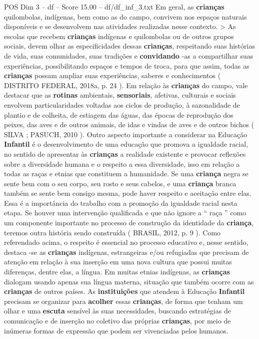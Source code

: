 \begin{textsample}{POS Dim 3 – df – Score 15.00 – df/df\_inf\_3.txt}
Em geral, as \textbf{crianças} quilombolas, indígenas, bem como as do campo, convivem nos espaços naturais disponíveis e se desenvolvem nas atividades realizadas nesse contexto. > As escolas que recebem \textbf{crianças} indígenas e quilombolas ou de outros grupos sociais, devem olhar as especificidades dessas \textbf{crianças}, respeitando suas histórias de vida, suas comunidades, suas tradições e \textbf{convidando} -as a compartilhar suas experiências, possibilitando espaços e tempos de troca, para que assim, todas as \textbf{crianças} possam ampliar suas experiências, saberes e conhecimentos ( DISTRITO FEDERAL, 2018a, p. 24 ).
Em relação às \textbf{crianças} do campo, vale destacar que as \textbf{rotinas} ambientais, \textbf{sensoriais}, afetivas, culturais e sociais envolvem particularidades voltadas aos ciclos de produção, à sazonalidade de plantio e de colheita, de estiagem das águas, das épocas de reprodução dos peixes, das aves e de outros animais, de idas e vindas de aves e de outros bichos ( SILVA ; PASUCH, 2010 ).
Outro aspecto importante a considerar na Educação \textbf{Infantil} é o desenvolvimento de uma educação que promova a igualdade racial, no sentido de apresentar às \textbf{crianças} a realidade existente e provocar reflexões sobre a diversidade humana e o respeito a essa diversidade, isso em relação a todas as raças e etnias que constituem a humanidade.
Se uma \textbf{criança} negra se sente bem com o seu corpo, seu rosto e seus cabelos, e uma \textbf{criança} branca também se sente bem consigo mesma, pode haver respeito e aceitação entre elas.
Essa é a importância do trabalho com a promoção da igualdade racial nesta etapa.
Se houver uma intervenção qualificada e que não ignore a “ raça ” como um componente importante no processo de construção da identidade da \textbf{criança}, teremos outra história sendo construída ( BRASIL, 2012, p. 9 ).
Como referendado acima, o respeito é essencial no processo educativo e, nesse sentido, destaca -se as \textbf{crianças} indígenas, estrangeiras e/ou refugiadas que precisam de atenção em relação à sua inserção em uma nova cultura que possui muitas diferenças, dentre elas, a língua.
Em muitas etnias indígenas, as \textbf{crianças} dialogam usando apenas sua língua materna, situação que também ocorre com as \textbf{crianças} de outros países.
As \textbf{instituições} que atendem à Educação \textbf{Infantil} precisam se organizar para \textbf{acolher} essas \textbf{crianças}, de forma que tenham um olhar e uma \textbf{escuta} sensível às suas necessidades, buscando estratégias de comunicação e de inserção no coletivo das próprias \textbf{crianças}, por meio de inúmeras formas de expressão que podem ser vivenciadas pelos humanos.

\end{textsample}
